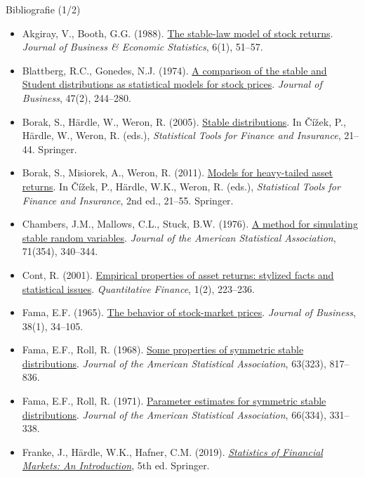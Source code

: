 \begin{frame}{Bibliografie (1/2)}
\itemsize{\tiny}
\begin{itemize}
    \item Akgiray, V., Booth, G.G. (1988). \href{https://doi.org/10.1080/07350015.1988.10509636}{The stable-law model of stock returns}. \textit{Journal of Business \& Economic Statistics}, 6(1), 51--57.
    \item Blattberg, R.C., Gonedes, N.J. (1974). \href{https://doi.org/10.1086/295634}{A comparison of the stable and Student distributions as statistical models for stock prices}. \textit{Journal of Business}, 47(2), 244--280.
    \item Borak, S., Härdle, W., Weron, R. (2005). \href{https://doi.org/10.1007/3-540-27395-6_1}{Stable distributions}. In Čížek, P., Härdle, W., Weron, R. (eds.), \textit{Statistical Tools for Finance and Insurance}, 21--44. Springer.
    \item Borak, S., Misiorek, A., Weron, R. (2011). \href{https://doi.org/10.1007/978-3-642-18062-0_1}{Models for heavy-tailed asset returns}. In Čížek, P., Härdle, W.K., Weron, R. (eds.), \textit{Statistical Tools for Finance and Insurance}, 2nd ed., 21--55. Springer.
    \item Chambers, J.M., Mallows, C.L., Stuck, B.W. (1976). \href{https://doi.org/10.1080/01621459.1976.10480344}{A method for simulating stable random variables}. \textit{Journal of the American Statistical Association}, 71(354), 340--344.
    \item Cont, R. (2001). \href{https://doi.org/10.1080/713665670}{Empirical properties of asset returns: stylized facts and statistical issues}. \textit{Quantitative Finance}, 1(2), 223--236.
    \item Fama, E.F. (1965). \href{https://doi.org/10.1086/294743}{The behavior of stock-market prices}. \textit{Journal of Business}, 38(1), 34--105.
    \item Fama, E.F., Roll, R. (1968). \href{https://doi.org/10.1080/01621459.1968.11009311}{Some properties of symmetric stable distributions}. \textit{Journal of the American Statistical Association}, 63(323), 817--836.
    \item Fama, E.F., Roll, R. (1971). \href{https://doi.org/10.1080/01621459.1971.10482264}{Parameter estimates for symmetric stable distributions}. \textit{Journal of the American Statistical Association}, 66(334), 331--338.
    \item Franke, J., Härdle, W.K., Hafner, C.M. (2019). \href{https://doi.org/10.1007/978-3-030-13751-9}{\textit{Statistics of Financial Markets: An Introduction}}, 5th ed. Springer.

\end{itemize}
\end{frame}
